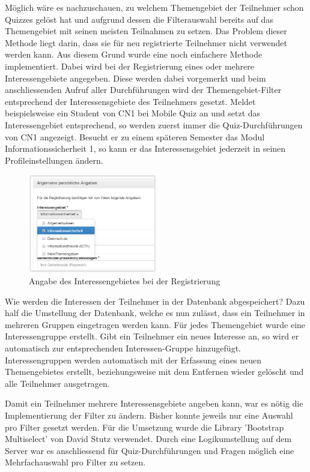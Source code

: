 Möglich wäre es nachzuschauen, zu welchem Themengebiet der Teilnehmer schon Quizzes gelöst hat und aufgrund dessen die Filterauswahl bereits auf das Themengebiet mit seinen meisten Teilnahmen zu setzen. Das Problem dieser Methode liegt darin, dass sie für neu registrierte Teilnehmer nicht verwendet werden kann.
Aus diesem Grund wurde eine noch einfachere Methode implementiert. Dabei wird bei der Registrierung eines oder mehrere Interessengebiete angegeben. Diese werden dabei vorgemerkt und beim anschliessenden Aufruf aller Durchführungen wird der Themengebiet-Filter entsprechend der Interessensgebiete des Teilnehmers gesetzt. Meldet beispielsweise ein Student von CN1 bei Mobile Quiz an und setzt das Interessengebiet entsprechend, so werden zuerst immer die Quiz-Durchführungen von CN1 angezeigt. Besucht er zu einem späteren Semester das Modul Informationssicherheit 1, so kann er das Interessensgebiet jederzeit in seinen Profileinstellungen ändern.

\begin{figure}[H]
	\centering
	\includegraphics[width=0.5\textwidth]{Images/Themengebiet_Angabe_Registrierung.PNG}
	\caption{Angabe des Interessengebietes bei der Registrierung}
\end{figure}

Wie werden die Interessen der Teilnehmer in der Datenbank abgespeichert? Dazu half die Umstellung der Datenbank, welche es nun zulässt, dass ein Teilnehmer in mehreren Gruppen eingetragen werden kann.
Für jedes Themengebiet wurde eine Interessengruppe erstellt. Gibt ein Teilnehmer ein neues Interesse an, so wird er automatisch zur entsprechenden Interessen-Gruppe hinzugefügt. Interessengruppen werden automatisch mit der Erfassung eines neuen Themengebietes erstellt, beziehungsweise mit dem Entfernen wieder gelöscht und alle Teilnehmer ausgetragen.

\bigskip

Damit ein Teilnehmer mehrere Interessensgebiete angeben kann, war es nötig die Implementierung der Filter zu ändern. Bisher konnte jeweils nur eine Auswahl pro Filter gesetzt werden. Für die Umsetzung wurde die Library 'Bootstrap Multiselect' \cite{bootstrap_multiselect} von David Stutz verwendet. Durch eine Logikumstellung auf dem Server war es anschliessend für Quiz-Durchführungen und Fragen möglich eine Mehrfachauswahl pro Filter zu setzen.

